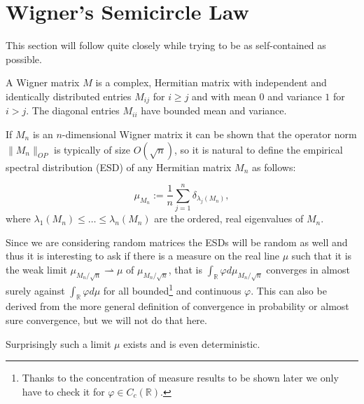 

\section{Wigner's Semicircle Law}
This section will follow \cite{TaoWSCL} quite closely while trying to be as self-contained as possible.

\begin{definition}
	A Wigner matrix $M$ is a complex, Hermitian matrix with independent and identically distributed entries $M_{ij}$ for $i\geq j$ and with mean $0$ and variance $1$ for $i>j$. The diagonal entries $M_{ii}$ have bounded mean and variance.
\end{definition}

If $M_n$ is an $n$-dimensional Wigner matrix it can be shown that the operator norm $\|M_n\|_{OP}$ is typically of size $O(\sqrt n)$, so it is natural to define the empirical spectral distribution (ESD) of any Hermitian matrix $M_n$ as follows:

\begin{definition}[ESD]
	\begin{equation*}
		\mu_{M_n}:=\frac{1}{n}\sum_{j=1}^n \delta_{\lambda_j(M_n)},
	\end{equation*}
	where $\lambda_1(M_n)\leq\dots\leq\lambda_n(M_n)$ are the ordered, real eigenvalues of $M_n$.
\end{definition}

Since we are considering random matrices the ESDs will be random as well and thus it is interesting to ask if there is a measure on the real line $\mu$ such that it is the weak limit $\mu_{M_n/\sqrt{n}}\rightharpoonup\mu$ of $\mu_{M_n/\sqrt{n}}$, that is $\int_\mathbb{R} \varphi d\mu_{M_n/\sqrt{n}}$ converges in almost surely against $\int_\mathbb{R} \varphi d\mu$ for all bounded\footnote{Thanks to the concentration of measure results to be shown later we only have to check it for $\varphi\in C_c(\mathbb R)$.} and continuous $\varphi$. This can also be derived from the more general definition of convergence in probability or almost sure convergence, but we will not do that here.

Surprisingly such a limit $\mu$ exists and is even deterministic.

